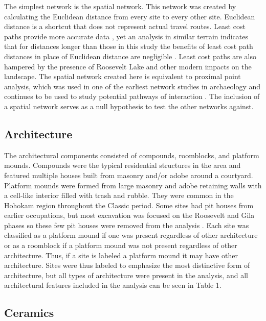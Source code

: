 \documentclass[]{interact}
\theoremstyle{plain}%
\theoremstyle{definition}
\theoremstyle{remark}
\begin{document}
The simplest network is the spatial network. This network was created by
calculating the Euclidean distance from every site to every other site.
Euclidean distance is a shortcut that does not represent actual travel
routes. Least cost paths provide more accurate data \citep[see][ for an
application in Tonto Basin]{Caseldine2022-uu}, yet an analysis in
similar terrain indicates that for distances longer than those in this
study the benefits of least cost path distances in place of Euclidean
distance are negligible \citep{Bischoff2017-gx}. Least cost paths are
also hampered by the presence of Roosevelt Lake and other modern impacts
on the landscape. The spatial network created here is equivalent to
proximal point analysis, which was used in one of the earliest network
studies in archaeology \citep{Terrell1977-co} and continues to be used
to study potential pathways of interaction
\citep[see][]{Broodbank2000-pg, Collar2013-fb}. The inclusion of a
spatial network serves as a null hypothesis to test the other networks
against.

\hypertarget{architecture}{%
\subsection*{Architecture}\label{architecture}}

The architectural components consisted of compounds, roomblocks, and
platform mounds. Compounds were the typical residential structures in
the area and featured multiple houses built from masonry and/or adobe
around a courtyard. Platform mounds were formed from large masonry and
adobe retaining walls with a cell-like interior filled with trash and
rubble. They were common in the Hohokam region throughout the Classic
period. Some sites had pit houses from earlier occupations, but most
excavation was focused on the Roosevelt and Gila phases so these few pit
houses were removed from the analysis \citep[see][]{Rice1998-ku}. Each
site was classified as a platform mound if one was present regardless of
other architecture or as a roomblock if a platform mound was not present
regardless of other architecture. Thus, if a site is labeled a platform
mound it may have other architecture. Sites were thus labeled to
emphasize the most distinctive form of architecture, but all types of
architecture were present in the analysis, and all architectural
features included in the analysis can be seen in Table 1.

\hypertarget{ceramics}{%
\subsection*{Ceramics}\label{ceramics}}
\end{document}
